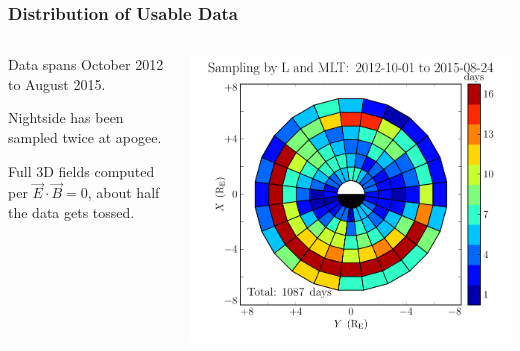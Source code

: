 \documentclass{beamer}
\begin{document}
\begin{frame}
\frametitle{Distribution of Usable Data}


\begin{columns}
\begin{wideitemize}
\item Data spans October 2012 to August 2015. 
\item Nightside has been sampled twice at apogee. 
\item Full 3D fields computed per $\vec{E} \cdot \vec{B} = 0$, about half the data gets tossed.
\end{wideitemize}
\includegraphics[width=\textwidth]{figures/pos_all_sharp.pdf}
\end{columns}

\end{frame}

\end{document}
